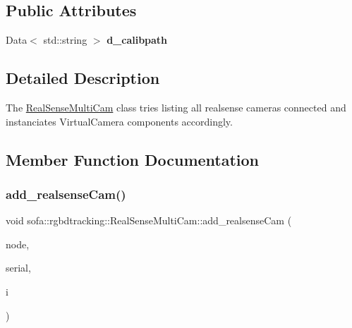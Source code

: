 \subsection*{Public Attributes}
\begin{DoxyCompactItemize}
\item 
\mbox{\label{classsofa_1_1rgbdtracking_1_1_real_sense_multi_cam_a21c85d20b8a9f952df7ba269f7aa810a}} 
Data$<$ std\+::string $>$ {\bfseries d\+\_\+calibpath}
\end{DoxyCompactItemize}


\subsection{Detailed Description}
The \hyperlink{classsofa_1_1rgbdtracking_1_1_real_sense_multi_cam}{Real\+Sense\+Multi\+Cam} class tries listing all realsense cameras connected and instanciates Virtual\+Camera components accordingly. 

\subsection{Member Function Documentation}
\mbox{\label{classsofa_1_1rgbdtracking_1_1_real_sense_multi_cam_a1aea376ebf5a7ee03af4cae251380e89}} 
\subsubsection{\texorpdfstring{add\+\_\+realsense\+Cam()}{add\_realsenseCam()}}
{\footnotesize\ttfamily void sofa\+::rgbdtracking\+::\+Real\+Sense\+Multi\+Cam\+::add\+\_\+realsense\+Cam (\begin{DoxyParamCaption}\item[{core\+::objectmodel\+::\+Base\+Context\+::\+S\+Ptr}]{node,  }\item[{std\+::string}]{serial,  }\item[{size\+\_\+t}]{i }\end{DoxyParamCaption})\hspace{0.3cm}{\ttfamily [inline]}}



